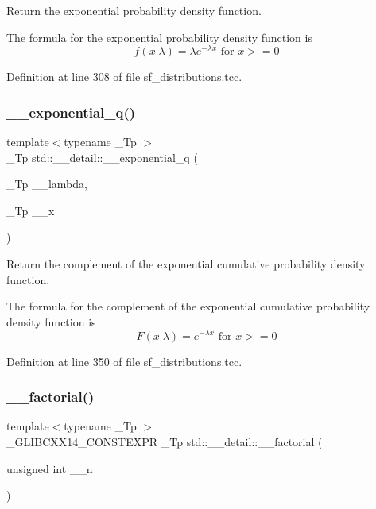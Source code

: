 Return the exponential probability density function. 

The formula for the exponential probability density function is \[ f(x|\lambda) = \lambda e^{-\lambda x} \mbox{ for } x >= 0 \] 

Definition at line 308 of file sf\+\_\+distributions.\+tcc.

\mbox{\label{namespacestd_1_1____detail_a53b59e7ff7bbe2185cbc153a4a5fd472}} 
\subsubsection{\texorpdfstring{\+\_\+\+\_\+exponential\+\_\+q()}{\_\_exponential\_q()}}
{\footnotesize\ttfamily template$<$typename \+\_\+\+Tp $>$ \\
\+\_\+\+Tp std\+::\+\_\+\+\_\+detail\+::\+\_\+\+\_\+exponential\+\_\+q (\begin{DoxyParamCaption}\item[{\+\_\+\+Tp}]{\+\_\+\+\_\+lambda,  }\item[{\+\_\+\+Tp}]{\+\_\+\+\_\+x }\end{DoxyParamCaption})}



Return the complement of the exponential cumulative probability density function. 

The formula for the complement of the exponential cumulative probability density function is \[ F(x|\lambda) = e^{-\lambda x} \mbox{ for } x >= 0 \] 

Definition at line 350 of file sf\+\_\+distributions.\+tcc.

\mbox{\label{namespacestd_1_1____detail_a8de5d6069cbef126684be0800f47f8b2}} 
\subsubsection{\texorpdfstring{\+\_\+\+\_\+factorial()}{\_\_factorial()}}
{\footnotesize\ttfamily template$<$typename \+\_\+\+Tp $>$ \\
\+\_\+\+G\+L\+I\+B\+C\+X\+X14\+\_\+\+C\+O\+N\+S\+T\+E\+X\+PR \+\_\+\+Tp std\+::\+\_\+\+\_\+detail\+::\+\_\+\+\_\+factorial (\begin{DoxyParamCaption}\item[{unsigned int}]{\+\_\+\+\_\+n }\end{DoxyParamCaption})}




